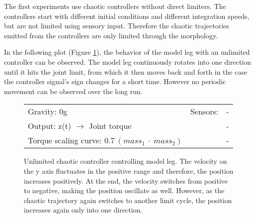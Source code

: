 \documentclass[main]{subfiles}
\begin{document}
The first experiments use chaotic controllers without direct limiters. %
%
The controllers start with different initial conditions and different integration speeds, but are not limited using sensory input. %
%
Therefore the chaotic trajectories emitted from the controllers are only limited through the morphology. %
%

In the following plot (Figure \ref{figure:unlimited-model-leg}), the behavior of the model leg with an unlimited controller can be observed. %
%
The model leg continuously rotates into one direction until it hits the joint limit, from which it then moves back and forth in the case the controller signal's sign changes for a short time. %
%
However no periodic movement can be observed over the long run. %

\begin{figure}[H]
	\centering
	\begin{minipage}{1.3\textwidth}
	\hspace*{-5em}
	\end{minipage}
	\caption[Unlimited chaotic controller controlling model leg.]{Unlimited chaotic controller controlling model leg. The velocity on the y axis fluctuates in the positive range and therefore, the position increases positively. At the end, the velocity switches from positive to negative, making the position oscillate as well. However, as the chaotic trajectory again switches to another limit cycle, the position increases again only into one direction.}
	\begin{tabular}{l|ll}
	\hline 
	Gravity: 0g  & Sensors: & - \\
	 Output: z(t) \(\rightarrow\) Joint torque & & - \\
	  Torque scaling curve: \(0.7~(mass_1~\cdot~mass_2)\) & & - \\
	  \hline
	\end{tabular}

	\label{figure:unlimited-model-leg}
\end{figure}
\end{document}
